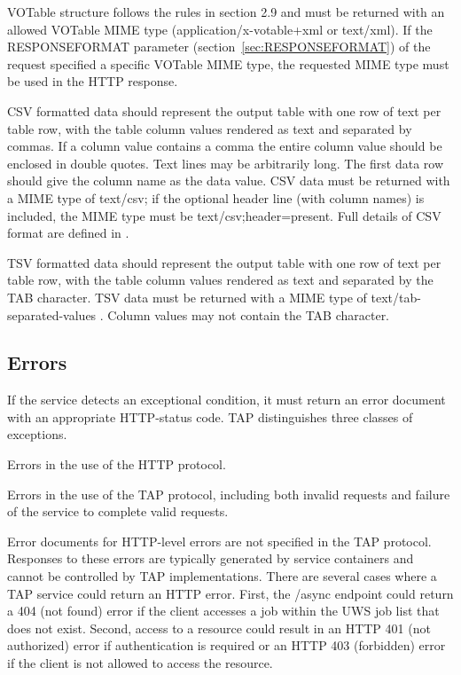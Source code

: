 \documentclass[11pt,letter]{ivoa}
\begin{document}
VOTable structure follows the rules in section 2.9 and must be returned with an 
allowed VOTable MIME type (application/x-votable+xml or text/xml). If the 
RESPONSEFORMAT parameter (section~\ref{sec:RESPONSEFORMAT}) of the request 
specified a specific VOTable MIME type, the requested MIME type must be used 
in the HTTP response.

CSV formatted data should represent the output table with one row of text per 
table row, with the table column values rendered as text and separated by 
commas. If a column value contains a comma the entire column value should be 
enclosed in double quotes.  Text lines may be arbitrarily long.  The first data 
row should give the column name as the data value.   CSV data must be returned 
with a MIME type of text/csv; if the optional header line (with column names) 
is included, the MIME type must be text/csv;header=present. Full details of CSV 
format are defined in \citep{std:CSV}.

TSV formatted data should represent the output table with one row of text per 
table row, with the table column values rendered as text and separated by the 
TAB character. TSV data must be returned with a MIME type of 
text/tab-separated-values \citep{std:TSV}. Column values may not contain the 
TAB 
character.

\subsection{Errors}
\label{sec:query-error}

If the service detects an exceptional condition, it must return an error 
document with an appropriate HTTP-status code. TAP distinguishes three classes 
of exceptions.

Errors in the use of the HTTP protocol. 

Errors in the use of the TAP protocol, including both invalid requests and 
failure of the service to complete valid requests. 

Error documents for HTTP-level errors are not specified in the TAP protocol. 
Responses to these errors are typically generated by service containers and 
cannot be controlled by TAP implementations. There are several cases where a 
TAP 
service could return an HTTP error. First, the /async endpoint could return a 
404 (not found) error if the client accesses a job within the UWS job list that 
does not exist. Second, access to a resource could result in an HTTP 401 (not 
authorized) error if authentication is required or an HTTP 403 (forbidden) 
error if the client is not allowed to access the resource.
\end{document}
